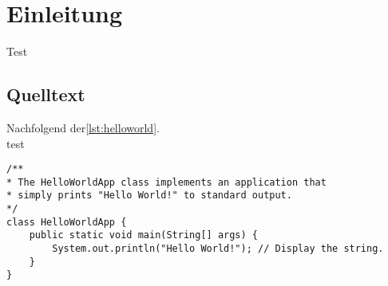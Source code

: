 \chapter{Einleitung}
Test\cite{Adler.2013}
\section{Quelltext}

Nachfolgend der\autoref{lst:helloworld}.\\
test\cite{Adler}

\begin{lstlisting}[caption={Hello World}, captionpos=b, label={lst:helloworld}]
/**
* The HelloWorldApp class implements an application that
* simply prints "Hello World!" to standard output.
*/
class HelloWorldApp {
	public static void main(String[] args) {
		System.out.println("Hello World!"); // Display the string.
	}
}
\end{lstlisting}
\blindtext
